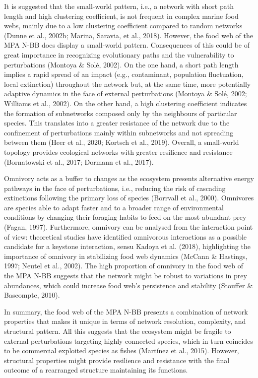 \documentclass[preprint, 3p,
authoryear]{elsarticle} %
\begin{document}
It is suggested that the small-world pattern, i.e., a network with short
path length and high clustering coefficient, is not frequent in complex
marine food webs, mainly due to a low clustering coefficient compared to
random networks (Dunne et al., 2002b; Marina, Saravia, et al., 2018).
However, the food web of the MPA N-BB does display a small-world
pattern. Consequences of this could be of great importance in
recognizing evolutionary paths and the vulnerability to perturbations
(Montoya \& Solé, 2002). On the one hand, a short path length implies a
rapid spread of an impact (e.g., contaminant, population fluctuation,
local extinction) throughout the network but, at the same time, more
potentially adaptive dynamics in the face of external perturbations
(Montoya \& Solé, 2002; Williams et al., 2002). On the other hand, a
high clustering coefficient indicates the formation of subnetworks
composed only by the neighbours of particular species. This translates
into a greater resistance of the network due to the confinement of
perturbations mainly within subnetworks and not spreading between them
(Heer et al., 2020; Kortsch et al., 2019). Overall, a small-world
topology provides ecological networks with greater resilience and
resistance (Bornatowski et al., 2017; Dormann et al., 2017).

Omnivory acts as a buffer to changes as the ecosystem presents
alternative energy pathways in the face of perturbations, i.e., reducing
the risk of cascading extinctions following the primary loss of species
(Borrvall et al., 2000). Omnivores are species able to adapt faster and
to a broader range of environmental conditions by changing their
foraging habits to feed on the most abundant prey (Fagan, 1997).
Furthermore, omnivory can be analysed from the interaction point of
view: theoretical studies have identified omnivorous interactions as a
possible candidate for a keystone interaction, sensu Kadoya et al.
(2018), highlighting the importance of omnivory in stabilizing food web
dynamics (McCann \& Hastings, 1997; Neutel et al., 2002). The high
proportion of omnivory in the food web of the MPA N-BB suggests that the
network might be robust to variations in prey abundances, which could
increase food web's persistence and stability (Stouffer \& Bascompte,
2010).

In summary, the food web of the MPA N-BB presents a combination of
network properties that makes it unique in terms of network resolution,
complexity, and structural pattern. All this suggests that the ecosystem
might be fragile to external perturbations targeting highly connected
species, which in turn coincides to be commercial exploited species as
fishes (Martínez et al., 2015). However, structural properties might
provide resilience and resistance with the final outcome of a rearranged
structure maintaining its functions.
\end{document}
